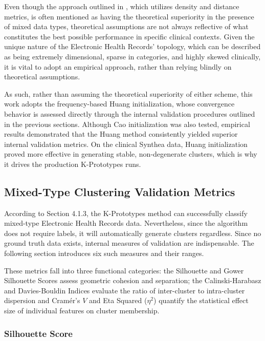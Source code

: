 Even though the approach outlined in \cite{cao2009}, which utilizes density and distance metrics, is often mentioned as having the theoretical superiority in the presence of mixed data types, theoretical assumptions are not always reflective of what constitutes the best possible performance in specific clinical contexts. Given the unique nature of the Electronic Health Records' topology, which can be described as being extremely dimensional, sparse in categories, and highly skewed clinically, it is vital to adopt an empirical approach, rather than relying blindly on theoretical assumptions.

As such, rather than assuming the theoretical superiority of either scheme, this work adopts the frequency-based Huang initialization, whose convergence behavior is assessed directly through the internal validation procedures outlined in the previous sections. Although Cao initialization was also tested, empirical results demonstrated that the Huang method consistently yielded superior internal validation metrics. On the clinical Synthea data, Huang initialization proved more effective in generating stable, non-degenerate clusters, which is why it drives the production K-Prototypes runs.

\subsection{Mixed-Type Clustering Validation Metrics}

According to Section 4.1.3, the K-Prototypes method can successfully classify mixed-type Electronic Health Records data. Nevertheless, since the algorithm does not require labels, it will automatically generate clusters regardless. Since no ground truth data exists, internal measures of validation are indispensable. The following section introduces six such measures and their ranges.

These metrics fall into three functional categories: the Silhouette and Gower Silhouette Scores assess geometric cohesion and separation; the Calinski-Harabasz and Davies-Bouldin Indices evaluate the ratio of inter-cluster to intra-cluster dispersion and Cramér's $V$ and Eta Squared ($\eta^2$) quantify the statistical effect size of individual features on cluster membership.

\subsubsection*{Silhouette Score}


